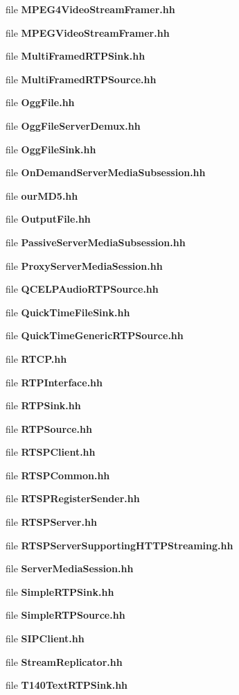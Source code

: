 \begin{DoxyCompactItemize}
file {\bf M\+P\+E\+G4\+Video\+Stream\+Framer.\+hh}
\item 
file {\bf M\+P\+E\+G\+Video\+Stream\+Framer.\+hh}
\item 
file {\bf Multi\+Framed\+R\+T\+P\+Sink.\+hh}
\item 
file {\bf Multi\+Framed\+R\+T\+P\+Source.\+hh}
\item 
file {\bf Ogg\+File.\+hh}
\item 
file {\bf Ogg\+File\+Server\+Demux.\+hh}
\item 
file {\bf Ogg\+File\+Sink.\+hh}
\item 
file {\bf On\+Demand\+Server\+Media\+Subsession.\+hh}
\item 
file {\bf our\+M\+D5.\+hh}
\item 
file {\bf Output\+File.\+hh}
\item 
file {\bf Passive\+Server\+Media\+Subsession.\+hh}
\item 
file {\bf Proxy\+Server\+Media\+Session.\+hh}
\item 
file {\bf Q\+C\+E\+L\+P\+Audio\+R\+T\+P\+Source.\+hh}
\item 
file {\bf Quick\+Time\+File\+Sink.\+hh}
\item 
file {\bf Quick\+Time\+Generic\+R\+T\+P\+Source.\+hh}
\item 
file {\bf R\+T\+C\+P.\+hh}
\item 
file {\bf R\+T\+P\+Interface.\+hh}
\item 
file {\bf R\+T\+P\+Sink.\+hh}
\item 
file {\bf R\+T\+P\+Source.\+hh}
\item 
file {\bf R\+T\+S\+P\+Client.\+hh}
\item 
file {\bf R\+T\+S\+P\+Common.\+hh}
\item 
file {\bf R\+T\+S\+P\+Register\+Sender.\+hh}
\item 
file {\bf R\+T\+S\+P\+Server.\+hh}
\item 
file {\bf R\+T\+S\+P\+Server\+Supporting\+H\+T\+T\+P\+Streaming.\+hh}
\item 
file {\bf Server\+Media\+Session.\+hh}
\item 
file {\bf Simple\+R\+T\+P\+Sink.\+hh}
\item 
file {\bf Simple\+R\+T\+P\+Source.\+hh}
\item 
file {\bf S\+I\+P\+Client.\+hh}
\item 
file {\bf Stream\+Replicator.\+hh}
\item 
file {\bf T140\+Text\+R\+T\+P\+Sink.\+hh}
\item 

\end{DoxyCompactItemize}
